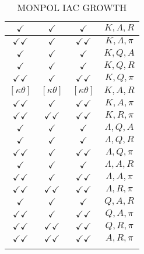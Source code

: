 \documentclass[a4paper,10pt]{article}
\begin{document}
\begin{longtable}{|c|c|c|c|}
\hline
$\checkmark$ & $\checkmark$ & $\checkmark$ & ${K},{\Lambda},{R}$ \\
\hline
$\checkmark\checkmark$ & $\checkmark$ & $\checkmark\checkmark$ & ${K},{\Lambda},{\pi}$ \\
\hline
$\checkmark$ & $\checkmark$ & $\checkmark$ & ${K},{Q},{A}$ \\
\hline
$\checkmark$ & $\checkmark$ & $\checkmark$ & ${K},{Q},{R}$ \\
\hline
$\checkmark\checkmark$ & $\checkmark$ & $\checkmark\checkmark$ & ${K},{Q},{\pi}$ \\
\hline
$[\kappa \theta ]$ & $[\kappa \theta ]$ & $[\kappa \theta ]$ & ${K},{A},{R}$ \\
\hline
$\checkmark\checkmark$ & $\checkmark$ & $\checkmark\checkmark$ & ${K},{A},{\pi}$ \\
\hline
$\checkmark\checkmark$ & $\checkmark\checkmark$ & $\checkmark\checkmark$ & ${K},{R},{\pi}$ \\
\hline
$\checkmark$ & $\checkmark$ & $\checkmark$ & ${\Lambda},{Q},{A}$ \\
\hline
$\checkmark$ & $\checkmark$ & $\checkmark$ & ${\Lambda},{Q},{R}$ \\
\hline
$\checkmark\checkmark$ & $\checkmark$ & $\checkmark\checkmark$ & ${\Lambda},{Q},{\pi}$ \\
\hline
$\checkmark$ & $\checkmark$ & $\checkmark$ & ${\Lambda},{A},{R}$ \\
\hline
$\checkmark\checkmark$ & $\checkmark$ & $\checkmark\checkmark$ & ${\Lambda},{A},{\pi}$ \\
\hline
$\checkmark\checkmark$ & $\checkmark\checkmark$ & $\checkmark\checkmark$ & ${\Lambda},{R},{\pi}$ \\
\hline
$\checkmark$ & $\checkmark$ & $\checkmark$ & ${Q},{A},{R}$ \\
\hline
$\checkmark\checkmark$ & $\checkmark$ & $\checkmark\checkmark$ & ${Q},{A},{\pi}$ \\
\hline
$\checkmark\checkmark$ & $\checkmark\checkmark$ & $\checkmark\checkmark$ & ${Q},{R},{\pi}$ \\
\hline
$\checkmark\checkmark$ & $\checkmark\checkmark$ & $\checkmark\checkmark$ & ${A},{R},{\pi}$ \\
\hline
\caption{MONPOL IAC GROWTH}
\label{table:MyTableLabel}
\end{longtable}
\end{document}
